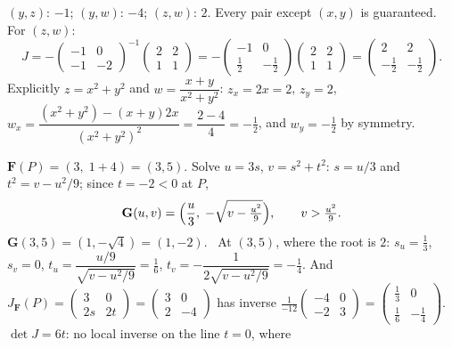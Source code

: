 \begin{solutions}
        $(y,z)$: $-1$; $(y,w)$: $-4$; $(z,w)$: $2$. Every pair except
        $(x,y)$ is guaranteed. For $(z,w)$:
        \[
          J=-\begin{pmatrix}-1&0\\-1&-2\end{pmatrix}^{-1}
            \begin{pmatrix}2&2\\1&1\end{pmatrix}
           =-\begin{pmatrix}-1&0\\\tfrac12&-\tfrac12\end{pmatrix}
            \begin{pmatrix}2&2\\1&1\end{pmatrix}
           =\begin{pmatrix}2&2\\-\tfrac12&-\tfrac12\end{pmatrix} .
        \]
        Explicitly $z=x^{2}+y^{2}$ and $w=\dfrac{x+y}{x^{2}+y^{2}}$:
        $z_{x}=2x=2$, $z_{y}=2$,
        $w_{x}=\dfrac{(x^{2}+y^{2})-(x+y)2x}{(x^{2}+y^{2})^{2}}
        =\dfrac{2-4}{4}=-\tfrac12$, and $w_{y}=-\tfrac12$ by symmetry.
        \checkmark
  \item $\mathbf{F}(P)=(3,\;1+4)=(3,5)$. Solve $u=3s$, $v=s^{2}+t^{2}$:
        $s=u/3$ and $t^{2}=v-u^{2}/9$; since $t=-2<0$ at $P$,
        \[
          \mathbf{G}(u,v)=\Bigl(\frac u3,\;-\sqrt{v-\tfrac{u^{2}}{9}}\Bigr),
          \qquad v>\tfrac{u^{2}}{9} .
        \]
        $\mathbf{G}(3,5)=(1,-\sqrt4)=(1,-2)$. \checkmark\ At $(3,5)$, where
        the root is $2$: $s_{u}=\tfrac13$, $s_{v}=0$,
        $t_{u}=\dfrac{u/9}{\sqrt{v-u^{2}/9}}=\tfrac16$,
        $t_{v}=-\dfrac{1}{2\sqrt{v-u^{2}/9}}=-\tfrac14$. And
        $J_{\mathbf{F}}(P)=\begin{pmatrix}3&0\\2s&2t\end{pmatrix}
        =\begin{pmatrix}3&0\\2&-4\end{pmatrix}$ has inverse
        $\tfrac{1}{-12}\begin{pmatrix}-4&0\\-2&3\end{pmatrix}
        =\begin{pmatrix}\tfrac13&0\\\tfrac16&-\tfrac14\end{pmatrix}$.
        \checkmark\ $\det J=6t$: no local inverse on the line $t=0$, where

\end{solutions}
